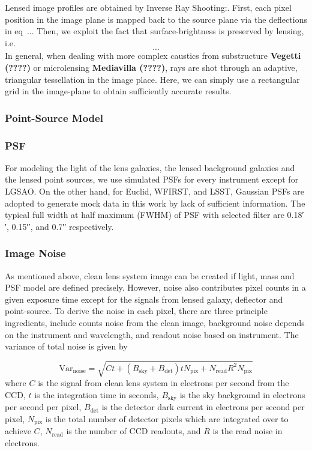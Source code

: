 \documentclass[a4paper,11pt]{article}
\begin{document}
Lensed image profiles are obtained by Inverse Ray Shooting:. First, each pixel position in the image plane is mapped back to the source plane via the deflections in eq~... Then, we exploit the fact that surface-brightness is preserved by lensing, i.e.
\begin{equation}
...
\end{equation}
In general, when dealing with more complex caustics from substructure \textbf{Vegetti (????)} or microlensing \textbf{Mediavilla (????)},
 rays are shot through an adaptive, triangular tessellation in the image place.
 Here, we can simply use a rectangular grid in the image-plane to obtain sufficiently accurate results.


\subsubsection{Point-Source Model}




\subsubsection{PSF}

For modeling the light of the lens galaxies, the lensed background galaxies and the lensed point sources, we use simulated PSFs for every instrument except for LGSAO. On the other hand, for Euclid, WFIRST, and LSST, Gaussian PSFs are adopted to generate mock data in this work by lack of sufficient information. The typical full width at half maximum (FWHM) of PSF with selected filter are 0.18′′, 0.15′′, and 0.7′′ respectively.


\subsubsection{Image Noise}

As mentioned above, clean lens system image can be created if light, mass and PSF model are defined precisely. However, noise also contributes pixel counts in a given exposure time except for the signals from lensed galaxy, deflector and point-source. To derive the noise in each pixel, there are three principle ingredients, include counts noise from the clean image, background noise depends on the instrument and wavelength, and readout noise based on instrument. The variance of total noise is given by

\begin{equation}
   \label{eq:noise}
   \mathrm{Var}_{\mathrm{noise}} = \sqrt{Ct+(B_{\mathrm{sky}}+B_{\mathrm{det}}) t N_{\mathrm{pix}} + N_{\mathrm{read}} R^{2} N_{\mathrm{pix}}}
\end{equation}
where $C$ is the signal from clean lens system in electrons per second from the CCD, $t$ is the integration time in seconds, $B_{\mathrm{sky}}$ is the sky background in electrons per second per pixel, $B_{\mathrm{det}}$ is the detector dark current in electrons per second per pixel, $N_{\mathrm{pix}}$ is the total number of detector pixels which are integrated over to achieve $C$, $N_{\mathrm{read}}$ is the number of CCD readouts, and $R$ is the read noise in electrons. 
\end{document}
